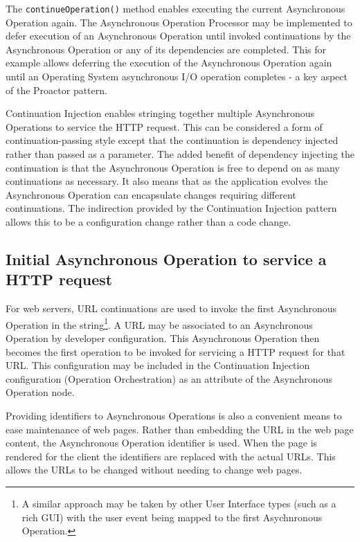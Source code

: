 \documentclass[prodmode]{style/acmlarge}
\begin{document}
The \texttt{continueOperation()} method enables executing the current
Asynchronous Operation again.  The Asynchronous Operation Processor may be
implemented to defer execution of an Asynchronous Operation until invoked
continuations by the Asynchronous Operation or any of its dependencies are
completed.  This for example allows deferring the execution of the Asynchronous
Operation again until an Operating System asynchronous I/O operation completes -
a key aspect of the Proactor pattern.

Continuation Injection enables stringing together multiple Asynchronous
Operations to service the HTTP request.  This can be considered a form of
continuation-passing style \cite{continuations} except that the continuation is
dependency injected rather than passed as a parameter.  The added benefit of
dependency injecting the continuation is that the Asynchronous Operation is free
to depend on as many continuations as necessary.  It also means that as the
application evolves the Asynchronous Operation can encapsulate changes requiring
different continuations.  The indirection provided by the Continuation Injection
pattern allows this to be a configuration change rather than a code change.


\subsection{Initial Asynchronous Operation to service a HTTP request}

For web servers, URL continuations \cite{url-continuation} are used to invoke
the first Asynchronous Operation in the string\footnote{A similar approach may
be taken by other User Interface types (such as a rich GUI) with the user event
being mapped to the first Asychnronous Operation.}.  A URL may be associated to
an Asynchronous Operation by developer configuration.  This Asynchronous
Operation then becomes the first operation to be invoked for servicing a HTTP
request for that URL.  This configuration may be included in the Continuation
Injection configuration (Operation Orchestration) as an attribute of the
Asynchronous Operation node.

Providing identifiers to Asynchronous Operations is also a convenient means to
ease maintenance of web pages.  Rather than embedding the URL in the web page
content, the Asynchronous Operation identifier is used.  When the page is
rendered for the client the identifiers are replaced with the actual URLs.
This allows the URLs to be changed without needing to change web pages.
\end{document}
